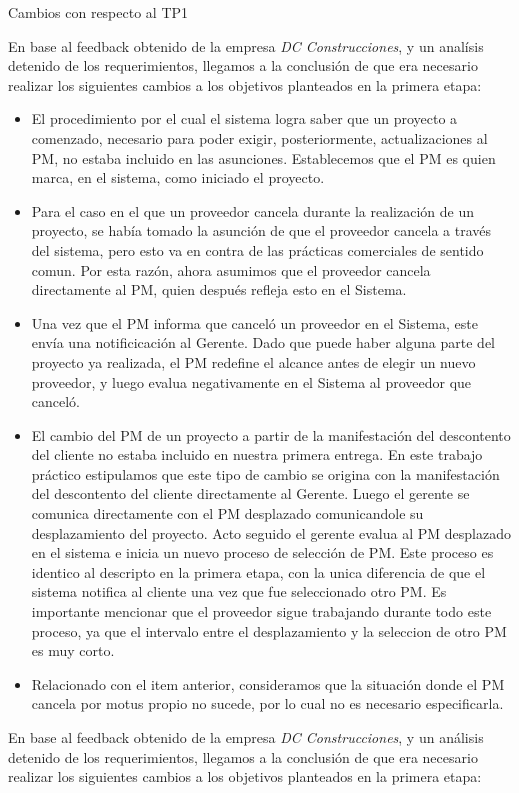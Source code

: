 Cambios con respecto al TP1


En base al feedback obtenido de la empresa \textit{DC Construcciones}, y un analísis detenido de los requerimientos, llegamos a la conclusión de que era necesario realizar los siguientes cambios a los objetivos planteados en la primera etapa:

\begin{itemize}
  \item El procedimiento por el cual el sistema logra saber que un proyecto a comenzado, necesario para poder exigir, posteriormente, actualizaciones al PM, no estaba incluido en las asunciones. Establecemos que el PM es quien marca, en el sistema, como iniciado el proyecto.
  \item Para el caso en el que un proveedor cancela durante la realización de un proyecto, se había tomado la asunción de que el proveedor cancela a través del sistema, pero esto va en contra de las prácticas comerciales de sentido comun. Por esta razón, ahora asumimos que el proveedor cancela directamente al PM, quien después refleja esto en el Sistema.
  \item Una vez que el PM informa que canceló un proveedor en el Sistema, este envía una notificicación al Gerente. Dado que puede haber alguna parte del proyecto ya realizada, el PM redefine el alcance antes de elegir un nuevo proveedor, y luego evalua negativamente en el Sistema al proveedor que canceló.
  \item El cambio del PM de un proyecto a partir de la manifestación del descontento del cliente no estaba incluido en nuestra primera entrega. En este trabajo práctico estipulamos que este tipo de cambio se origina con la manifestación del descontento del cliente directamente al Gerente. Luego el gerente se comunica directamente con el PM desplazado comunicandole su desplazamiento del proyecto. Acto seguido el gerente evalua al PM desplazado en el sistema e inicia un nuevo proceso de selección de PM. Este proceso es identico al descripto en la primera etapa, con la unica diferencia de que el sistema notifica al cliente una vez que fue seleccionado otro PM. Es importante mencionar que el proveedor sigue trabajando durante todo este proceso, ya que el intervalo entre el desplazamiento y la seleccion de otro PM es muy corto.
  \item Relacionado con el item anterior, consideramos que la situación donde el PM cancela por motus propio no sucede, por lo cual no es necesario especificarla.  
\end{itemize}
En base al feedback obtenido de la empresa \textit{DC Construcciones}, y un análisis detenido de los requerimientos, llegamos a la conclusión de que era necesario realizar los siguientes cambios a los objetivos planteados en la primera etapa:

